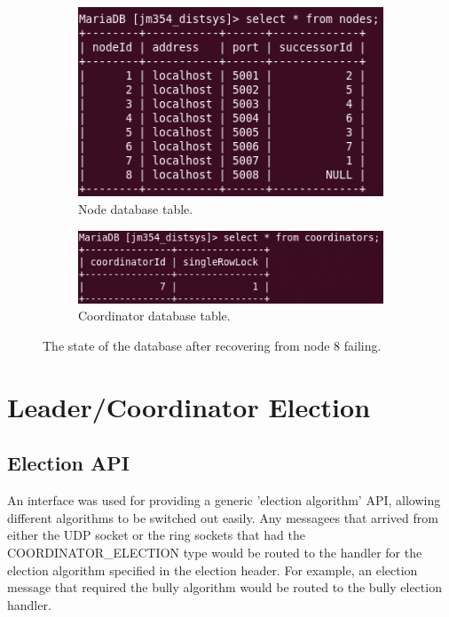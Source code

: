 \documentclass[12pt]{article}
\begin{document}
\begin{figure}[!ht]
\centering
\begin{subfigure}{.5\textwidth}
  \centering
  \includegraphics[width=0.95\linewidth]{images/afterfailnodes}
  \caption{Node database table.}
  \label{fig:nodetableafterfail}
\end{subfigure}%
\begin{subfigure}{.5\textwidth}
  \centering
  \includegraphics[width=0.95\linewidth]{images/afterfailcoord}
  \caption{Coordinator database table.}
  \label{fig:coordtableafterfail}
\end{subfigure}
\caption{The state of the database after recovering from node 8 failing.}
\label{fig:dbstateafterfail}
\end{figure}



\section{Leader/Coordinator Election}

\subsection{Election API}

An interface was used for providing a generic 'election algorithm' API, allowing different algorithms to be switched out easily. Any messagees that arrived from either the UDP socket or the ring sockets that had the COORDINATOR\_ELECTION type would be routed to the handler for the election algorithm specified in the election header. For example, an election message that required the bully algorithm would be routed to the bully election handler.
\end{document}
